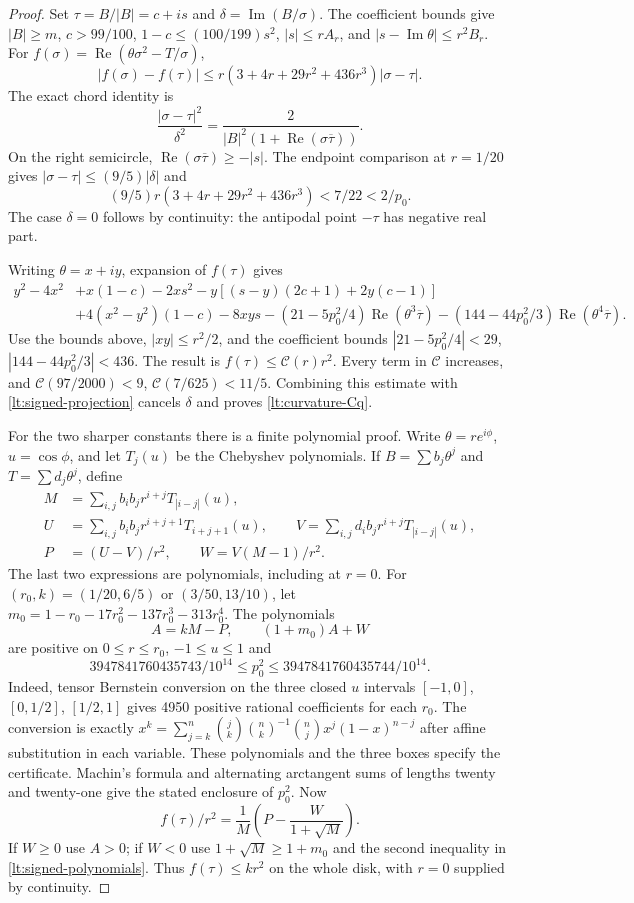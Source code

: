 \documentclass[11pt,reqno]{amsart}
\numberwithin{equation}{section}
\theoremstyle{definition}
\theoremstyle{remark}
\renewcommand{\Re}{\operatorname{Re}}
\renewcommand{\Im}{\operatorname{Im}}
\begin{document}
\begin{proof}
Set $\tau=B/|B|=c+is$ and $\delta=\Im(B/\sigma)$.
The coefficient bounds give $|B|\ge m$, $c>99/100$,
$1-c\le(100/199)s^2$, $|s|\le rA_r$, and
$|s-\Im\theta|\le r^2B_r$. For
$f(\sigma)=\Re(\theta\sigma^2-T/\sigma)$,
\[
 |f(\sigma)-f(\tau)|
 \le r(3+4r+29r^2+436r^3)|\sigma-\tau|.
\]
The exact chord identity is
\[
 \frac{|\sigma-\tau|^2}{\delta^2}
   =\frac{2}{|B|^2(1+\Re(\sigma\overline\tau))}.
\]
On the right semicircle, $\Re(\sigma\overline\tau)\ge-|s|$.
The endpoint comparison at $r=1/20$ gives
$|\sigma-\tau|\le(9/5)|\delta|$ and
\[
 (9/5)r(3+4r+29r^2+436r^3)<7/22<2/p_0.
\]
The case $\delta=0$ follows by continuity: the antipodal point
$-\tau$ has negative real part.

Writing $\theta=x+iy$, expansion of $f(\tau)$ gives
\begin{align*}
 y^2-4x^2&+x(1-c)-2xs^2-y[(s-y)(2c+1)+2y(c-1)]\\
 &+4(x^2-y^2)(1-c)-8xys
 -(21-5p_0^2/4)\Re(\theta^3\overline\tau)
 -(144-44p_0^2/3)\Re(\theta^4\overline\tau).
\end{align*}
Use the bounds above, $|xy|\le r^2/2$, and the coefficient bounds
$|21-5p_0^2/4|<29$, $|144-44p_0^2/3|<436$.
The result is $f(\tau)\le\mathcal C(r)r^2$.
Every term in $\mathcal C$ increases, and
$\mathcal C(97/2000)<9$, $\mathcal C(7/625)<11/5$.
Combining this estimate with \eqref{lt:signed-projection} cancels
$\delta$ and proves \eqref{lt:curvature-Cq}.

For the two sharper constants there is a finite polynomial proof.
Write $\theta=re^{i\phi}$, $u=\cos\phi$, and let $T_j(u)$ be the
Chebyshev polynomials. If $B=\sum b_j\theta^j$ and
$T=\sum d_j\theta^j$, define
\begin{align*}
 M&=\sum_{i,j}b_ib_jr^{i+j}T_{|i-j|}(u),\\
 U&=\sum_{i,j}b_ib_jr^{i+j+1}T_{i+j+1}(u),\qquad
 V=\sum_{i,j}d_ib_jr^{i+j}T_{|i-j|}(u),\\
 P&=(U-V)/r^2,\qquad W=V(M-1)/r^2.
\end{align*}
The last two expressions are polynomials, including at $r=0$.
For $(r_0,k)=(1/20,6/5)$ or $(3/50,13/10)$, let
$m_0=1-r_0-17r_0^2-137r_0^3-313r_0^4$. The polynomials
\begin{equation}\label{lt:signed-polynomials}
 A=kM-P,\qquad (1+m_0)A+W
\end{equation}
are positive on $0\le r\le r_0$, $-1\le u\le1$ and
\[
 3947841760435743/10^{14}\le p_0^2
           \le3947841760435744/10^{14}.
\]
Indeed, tensor Bernstein conversion on the three closed $u$ intervals
$[-1,0]$, $[0,1/2]$, $[1/2,1]$ gives 4950 positive rational
coefficients for each $r_0$. The conversion is exactly
$x^k=\sum_{j=k}^n\binom jk\binom nk^{-1}
\binom njx^j(1-x)^{n-j}$ after affine substitution in each variable.
These polynomials and the three boxes specify the certificate.
Machin's formula and alternating arctangent sums of
lengths twenty and twenty-one give the stated enclosure of $p_0^2$.
Now
\[
 f(\tau)/r^2=\frac1M\left(P-\frac{W}{1+\sqrt M}\right).
\]
If $W\ge0$ use $A>0$; if $W<0$ use $1+\sqrt M\ge1+m_0$ and
the second inequality in \eqref{lt:signed-polynomials}. Thus
$f(\tau)\le kr^2$ on the whole disk, with $r=0$ supplied by continuity.


\end{proof}
\end{document}
